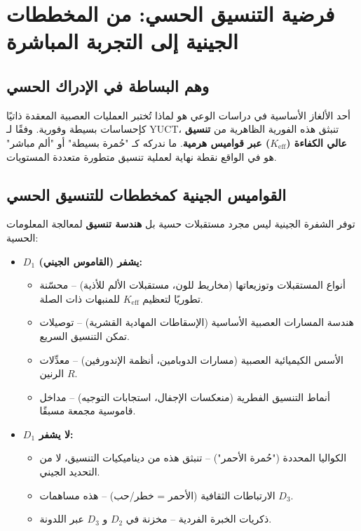\documentclass[12pt,a4paper]{article}
\newcommand{\eff}{\mathrm{eff}}
\newcommand{\Ke}{K_{\eff}}
\begin{document}
	\section{فرضية التنسيق الحسي: من المخططات الجينية إلى التجربة المباشرة}
	
	\subsection{وهم البساطة في الإدراك الحسي}
	
	أحد الألغاز الأساسية في دراسات الوعي هو لماذا تُختبر العمليات العصبية المعقدة ذاتيًا كإحساسات بسيطة وفورية. وفقًا لـ YUCT، تنبثق هذه الفورية الظاهرية من \textbf{تنسيق عالي الكفاءة (\(\Ke\)) عبر قواميس هرمية}. ما ندركه كـ "حُمرة بسيطة" أو "ألم مباشر" هو في الواقع نقطة نهاية لعملية تنسيق متطورة متعددة المستويات.
	
	\subsection{القواميس الجينية كمخططات للتنسيق الحسي}
	
	توفر الشفرة الجينية ليس مجرد مستقبلات حسية بل \textbf{هندسة تنسيق} لمعالجة المعلومات الحسية:
	
	\begin{itemize}
		\item \textbf{\(D_1\) (القاموس الجيني) يشفر:}
		\begin{itemize}
			\item أنواع المستقبلات وتوزيعاتها (مخاريط للون، مستقبلات الألم للأذية) – محسّنة تطوريًا لتعظيم \(\Ke\) للمنبهات ذات الصلة.
			\item هندسة المسارات العصبية الأساسية (الإسقاطات المهادية القشرية) – توصيلات تمكن التنسيق السريع.
			\item الأسس الكيميائية العصبية (مسارات الدوبامين، أنظمة الإندورفين) – معدِّلات الرنين \(R\).
			\item أنماط التنسيق الفطرية (منعكسات الإجفال، استجابات التوجيه) – مداخل قاموسية مجمعة مسبقًا.
		\end{itemize}
		
		\item \textbf{\(D_1\) لا يشفر:}
		\begin{itemize}
			\item الكواليا المحددة ("حُمرة الأحمر") – تنبثق هذه من ديناميكيات التنسيق، لا من التحديد الجيني.
			\item الارتباطات الثقافية (الأحمر = خطر/حب) – هذه مساهمات \(D_3\).
			\item ذكريات الخبرة الفردية – مخزنة في \(D_2\) و \(D_3\) عبر اللدونة.
		\end{itemize}
	\end{itemize}
	
\end{document}
